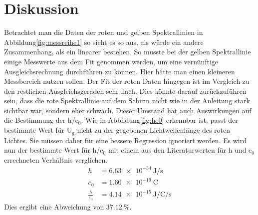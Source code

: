\section{Diskussion}
\label{sec:Diskussion}

Betrachtet man die Daten der roten und gelben Spektrallinien in Abbildung\ref{fig:messreihe1} so sieht es so aus, als würde ein andere Zusammenhang, als ein linearer bestehen.
So musste bei der gelben Spektrallinie einige Messwerte aus dem Fit genommen werden, um eine vernünftige Ausgleichsrechnung durchführen zu können.
Hier hätte man einen kleineren Messbereich nutzen sollen.
Der Fit der roten Daten hingegen ist im Vergleich zu den restlichen Ausgleichsgeraden sehr flach.
Dies könnte darauf zurückzuführen sein, dass die rote Spektrallinie auf dem Schirm nicht wie in der Anleitung stark sichtbar war, sondern eher schwach.
Dieser Umstand hat auch Auswirkungen auf die Bestimmung der h/e$_0$.
Wie in Abbildung\ref{fig:he0} erkennbar ist, passt der bestimmte Wert für U$_\text{g}$ nicht zu der gegebenen Lichtwellenlänge des roten Lichtes.
Sie müssen daher für eine bessere Regression ignoriert werden.
Es wird nun der bestimmte Wert für h/e$_0$ mit einem aus den Literaturwerten für h\cite{Planck} und e$_0$\cite{Ladung} errechneten Verhältnis verglichen.
\begin{align*}
  h &= \SI{6.63e-34}{\joule\per\second} \\
  e_0 &= \SI{1.60e-19}{\coulomb} \\
  \frac{h}{e_0} &= \SI{4.14e-15}{\joule\per\coulomb\per\second}
\end{align*}
Dies ergibt eine Abweichung von $\SI{37.12}{\percent}$.
